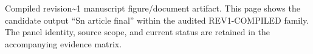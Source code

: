 Compiled revision\textasciitilde{}1 manuscript figure/document artifact. This page shows the candidate output ``Sn article final'' within the audited REV1-COMPILED family. The panel identity, source scope, and current status are retained in the accompanying evidence matrix.
